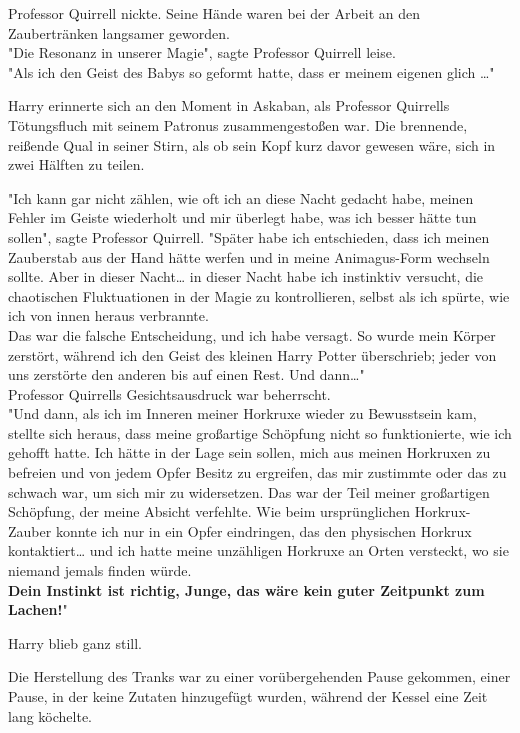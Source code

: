 {Professor Quirrell nickte. Seine Hände waren bei der Arbeit an den Zaubertränken langsamer geworden.\\ "Die Resonanz in unserer Magie", sagte Professor Quirrell leise.\\ "Als ich den Geist des Babys so geformt hatte, dass er meinem eigenen glich …"

Harry erinnerte sich an den Moment in Askaban, als Professor Quirrells Tötungsfluch mit seinem Patronus zusammengestoßen war. Die brennende, reißende Qual in seiner Stirn, als ob sein Kopf kurz davor gewesen wäre, sich in zwei Hälften zu teilen.

"Ich kann gar nicht zählen, wie oft ich an diese Nacht gedacht habe, meinen Fehler im Geiste wiederholt und mir überlegt habe, was ich besser hätte tun sollen", sagte Professor Quirrell. "Später habe ich entschieden, dass ich meinen Zauberstab aus der Hand hätte werfen und in meine Animagus-Form wechseln sollte. Aber in dieser Nacht… in dieser Nacht habe ich instinktiv versucht, die chaotischen Fluktuationen in der Magie zu kontrollieren, selbst als ich spürte, wie ich von innen heraus verbrannte.\\ Das war die falsche Entscheidung, und ich habe versagt. So wurde mein Körper zerstört, während ich den Geist des kleinen Harry Potter überschrieb; jeder von uns zerstörte den anderen bis auf einen Rest. Und dann…"\\ Professor Quirrells Gesichtsausdruck war beherrscht.\\ "Und dann, als ich im Inneren meiner Horkruxe wieder zu Bewusstsein kam, stellte sich heraus, dass meine großartige Schöpfung nicht so funktionierte, wie ich gehofft hatte. Ich hätte in der Lage sein sollen, mich aus meinen Horkruxen zu befreien und von jedem Opfer Besitz zu ergreifen, das mir zustimmte oder das zu schwach war, um sich mir zu widersetzen. Das war der Teil meiner großartigen Schöpfung, der meine Absicht verfehlte. Wie beim ursprünglichen Horkrux-Zauber konnte ich nur in ein Opfer eindringen, das den physischen Horkrux kontaktiert… und ich hatte meine unzähligen Horkruxe an Orten versteckt, wo sie niemand jemals finden würde.\\ \textbf{Dein Instinkt ist richtig, Junge, das wäre kein guter Zeitpunkt zum Lachen!}"

Harry blieb ganz still.

Die Herstellung des Tranks war zu einer vorübergehenden Pause gekommen, einer Pause, in der keine Zutaten hinzugefügt wurden, während der Kessel eine Zeit lang köchelte.

}
